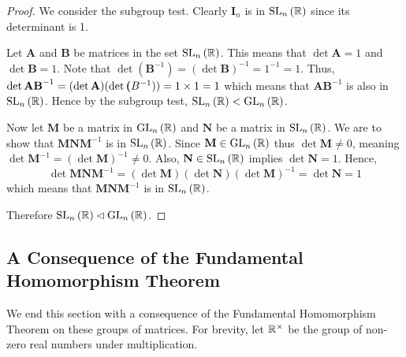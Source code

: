 \begin{proof}
    We consider the subgroup test. Clearly $\textbf{I}_n$ is in $\mathrm{SL}_{n}\left(\mathbb{R}\right)$ since its determinant is 1.

    Let \textbf{A} and \textbf{B} be matrices in the set $\mathrm{SL}_{n}\left(\mathbb{R}\right)$. This means that $\det \textbf{A} = 1$ and $\det \textbf{B} = 1$. Note that $\det(\textbf{B}^{-1}) = (\det \textbf{B})^{-1} = 1^{-1} = 1$. Thus, $\det \textbf{AB}^{-1} = (\det \textbf{A})(\det \textbf({B}^{-1})) = 1 \times 1  = 1$ which means that $\textbf{AB}^{-1}$ is also in $\mathrm{SL}_{n}\left(\mathbb{R}\right)$. Hence by the subgroup test, $\mathrm{SL}_{n}\left(\mathbb{R}\right) < \mathrm{GL}_{n}\left(\mathbb{R}\right)$.
    
    Now let $\textbf{M}$ be a matrix in $\mathrm{GL}_{n}\left(\mathbb{R}\right)$ and $\textbf{N}$ be a matrix in $\mathrm{SL}_{n}\left(\mathbb{R}\right)$. We are to show that $\textbf{MNM}^{-1}$ is in $\mathrm{SL}_{n}\left(\mathbb{R}\right)$. Since $\textbf{M} \in \mathrm{GL}_{n}\left(\mathbb{R}\right)$ thus $\det \textbf{M} \neq 0$, meaning $\det \textbf{M}^{-1} = (\det \textbf{M})^{-1} \neq 0$. Also, $\textbf{N} \in \mathrm{SL}_{n}\left(\mathbb{R}\right)$ implies $\det \textbf{N} = 1$. Hence,
    \[
        \det \textbf{MNM}^{-1} = (\det \textbf{M})(\det \textbf{N})(\det \textbf{M})^{-1} = \det \textbf{N} = 1
    \]
    which means that $\textbf{MNM}^{-1}$ is in $\mathrm{SL}_{n}\left(\mathbb{R}\right)$.

    Therefore $\mathrm{SL}_{n}\left(\mathbb{R}\right) \lhd \mathrm{GL}_{n}\left(\mathbb{R}\right)$.
\end{proof}

\subsection{A Consequence of the Fundamental Homomorphism Theorem}
We end this section with a consequence of the Fundamental Homomorphism Theorem on these groups of matrices. For brevity, let $\mathbb{R}^\times$ be the group of non-zero real numbers under multiplication.

